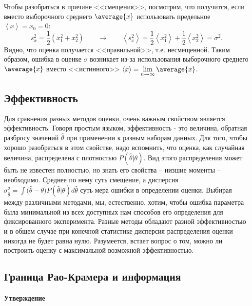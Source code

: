 {    Чтобы разобраться в причине <<смещения>>,
    посмотрим, что получится, если вместо выборочного среднего $\average{x}$
    использовать предельное $\left\langle x\right\rangle =x_{0}=0$:
    \[
    s_{x}^{2}=\frac{1}{2}\left(x_{1}^{2}+x_{2}^{2}\right)\qquad\to\qquad\left\langle s_{x}^{2}\right\rangle =\frac{1}{2}\left\langle x_{1}^{2}\right\rangle +\frac{1}{2}\left\langle x_{2}^{2}\right\rangle =\sigma^{2}.
    \]
    Видно, что оценка получается <<правильной>>,
    т.е. несмещенной. Таким образом, ошибка в оценке $\sigma$ возникает
    из-за использования выборочного среднего $\average{x}$ вместо <<истинного>>
    $\left\langle x\right\rangle =\lim\limits_{n\to\infty}\average{x}$.
}

\subsection{Эффективность}

Для сравнения разных методов оценки, очень важным свойством является
эффективность. Говоря простым языком, эффективность - это величина,
обратная разбросу значений $\hat{\theta}$ при применении к разным
наборам данных. Для того, чтобы хорошо разобраться в этом свойстве, надо
вспомнить, что оценка, как случайная величина, распределена с плотностью
$P(\hat\theta | \theta)$. Вид этого распределения может быть не
известен полностью, но знать его свойства -- низшие моменты --
необходимо. Среднее по нему суть смещение, а дисперсия
$\sigma_{\hat\theta}^2 = \int{ (\hat\theta - \theta} ) P(\hat\theta | \theta) d\hat\theta$
суть мера ошибки в определении оценки. Выбирая между различными
методами, мы, естественно, хотим, чтобы ошибка параметра была
минимальной из всех доступных нам способов его определения для
фиксированного эксперимента. Разные методы обладают разной
эффективностью и в общем случае при конечной статистике дисперсия
распределения оценки никогда не будет равна нулю. Разумеется, встает
вопрос о том, можно ли построить оценку с максимальной возможной
эффективностью.

\subsection{Граница Рао-Крамера и информация}

\paragraph{Утверждение}

